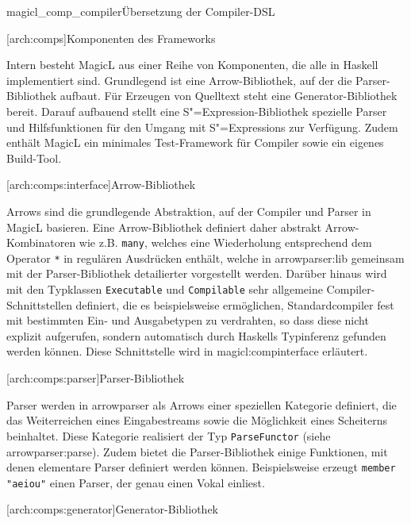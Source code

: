 \documentclass[12pt, a4paper, bibgerm]{scrbook}
\newcommand\icode[1]{\lstinline?#1?}
\newcommand\lsection{}
\newcommand\lsubsection{}
\newcommand\cref{}
\newcommand\sref{}
\newcommand\fig{}
\newcommand{\sees}[1]{(siehe \sref{#1})}
\newcommand{\sexp}{S"=Expression}
\newcommand{\sexps}{S"=Expressions}
\begin{document}
\fig{magicl_comp_compiler}{Übersetzung der Compiler-DSL}

\lsection[arch:comps]{Komponenten des Frameworks}

Intern besteht MagicL aus einer Reihe von Komponenten, die alle in
Haskell implementiert sind. Grundlegend ist eine Arrow-Bibliothek, auf
der die Parser-Bibliothek aufbaut. Für Erzeugen von Quelltext steht eine
Generator-Bibliothek bereit. Darauf aufbauend stellt eine
\sexp{}-Bibliothek spezielle Parser und Hilfsfunktionen für den Umgang
mit \sexps{} zur Verfügung. Zudem enthält MagicL ein minimales
Test-Framework für Compiler sowie ein eigenes Build-Tool.

\lsubsection[arch:comps:interface]{Arrow-Bibliothek}

Arrows sind die grundlegende Abstraktion, auf der Compiler und Parser in
MagicL basieren. Eine Arrow-Bibliothek definiert daher abstrakt
Arrow-Kombinatoren wie z.B. \icode{many}, welches eine Wiederholung
entsprechend dem Operator \icode{*} in regulären Ausdrücken enthält,
welche in \sref{arrowparser:lib} gemeinsam mit der Parser-Bibliothek
detailierter vorgestellt werden.  Darüber hinaus wird mit den Typklassen
\icode{Executable} und \icode{Compilable} sehr allgemeine
Compiler-Schnittstellen definiert, die es beispielsweise ermöglichen,
Standardcompiler fest mit bestimmten Ein- und Ausgabetypen zu
verdrahten, so dass diese nicht explizit aufgerufen, sondern automatisch
durch Haskells Typinferenz gefunden werden können. Diese Schnittstelle
wird in \sref{magicl:compinterface} erläutert.

\lsubsection[arch:comps:parser]{Parser-Bibliothek}

Parser werden in \cref{arrowparser} als Arrows einer speziellen
Kategorie definiert, die das Weiterreichen eines Eingabestreams sowie
die Möglichkeit eines Scheiterns beinhaltet. Diese Kategorie realisiert
der Typ \icode{ParseFunctor} \sees{arrowparser:parse}. Zudem bietet
die Parser-Bibliothek einige Funktionen, mit denen elementare Parser
definiert werden können. Beispielsweise erzeugt \icode{member "aeiou"}
einen Parser, der genau einen Vokal einliest. 

\lsubsection[arch:comps:generator]{Generator-Bibliothek}
\end{document}
